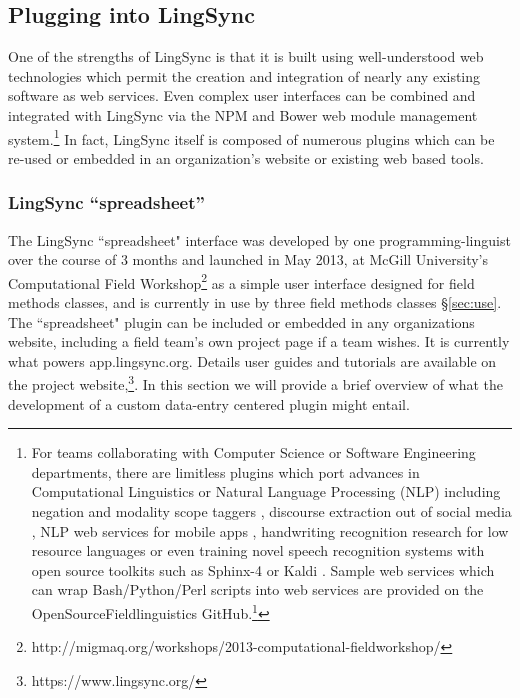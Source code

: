 \documentclass[letterpaper, 12pt, dvips]{mitwpl}
\begin{document}
\subsection{Plugging into LingSync}
\label{sec:plugins}


One of the strengths of LingSync is that it is built using well-understood web technologies which permit the creation and integration of nearly any existing software as web services. 
Even complex user interfaces can be combined and integrated with LingSync via the NPM and Bower web module management system.\footnote{
For teams collaborating with Computer Science or Software Engineering departments, there are limitless plugins which port advances in Computational Linguistics  \citep{Chen:2011}  or Natural Language Processing (NLP) including  negation and modality scope taggers  \citep{Rosenberg:2012}, %
discourse extraction out of social media  \citep{Dubuc:2010},  
NLP web services for mobile apps \citep{Sateli:2013},
 handwriting recognition research for low resource languages \citep{Sadri:2007} or even training novel speech recognition systems with
 open source toolkits such as Sphinx-4 \citep{Walker:2004} or Kaldi \citep{Povey:2011}.
Sample web services which can wrap Bash/Python/Perl scripts  into web services are provided on the OpenSourceFieldlinguistics GitHub.\footnote{https://github.com/OpenSourceFieldlinguistics} %
}
In fact, LingSync itself is composed of numerous plugins which can be re-used or embedded in an organization's website or existing web based tools.

\subsubsection{LingSync ``spreadsheet''}
\label{sec:spreadsheet}

The LingSync ``spreadsheet" interface was developed by one programming-linguist over the course of 3 months and launched in May 2013, at McGill University's Computational Field Workshop\footnote{http://migmaq.org/workshops/2013-computational-fieldworkshop/} as a simple user interface designed  for field methods classes, and is currently in use by three field methods classes \S \ref{sec:use}. The ``spreadsheet"  plugin can be included or embedded in any organizations website, including a field team's own project page if a team wishes. It is currently what powers app.lingsync.org. Details user guides and tutorials are available on the project website,\footnote{https://www.lingsync.org/}. In this section we will provide a brief overview of what the development of a custom data-entry centered plugin might entail.
\end{document}

